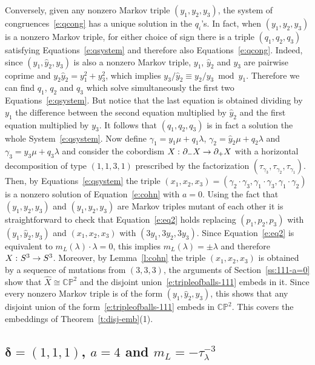 \documentclass[11pt,a4paper]{amsart}
\newcommand{\CP}{\mathbb{CP}}
\newcommand{\de}{\delta}
\newcommand{\ga}{\gamma}
\newcommand{\la}{\lambda}
\newcommand{\del}{\partial}
\newcommand{\co}{\thinspace\colon}
\newcommand{\bde}{\bm{\de}}
\theoremstyle{definition}
\numberwithin{equation}{section}
\begin{document}
Conversely, given any nonzero Markov triple 
$(y_1,y_2,y_3)$, the system of 
congruences~\eqref{e:qcong} has a unique solution in the $q_i$'s. In fact, when 
$(y_1,y_2,y_3)$ is a nonzero Markov triple, for either choice of sign 
there is a triple $(q_1,q_2,q_3)$ satisfying 
Equations~\eqref{e:qsystem} and therefore also Equations~\eqref{e:qcong}. Indeed, 
since $(y_1,\hat y_2,y_3)$ is also a nonzero Markov triple, $y_1$, $\hat y_2$ and $y_3$ are 
pairwise coprime and $y_2 \hat y_2=y_1^2+y_3^2$, which implies 
$y_3/\hat y_2\equiv y_2/y_3\bmod y_1$. 
Therefore we can find $q_1$, $q_2$ and $q_3$ which solve simultaneously 
the first two Equations~\eqref{e:qsystem}. 
But notice that the last equation is obtained dividing by $y_1$ the difference between 
the second equation multiplied by $\hat y_2$ 
and the first equation multiplied by $y_3$. 
It follows that $(q_1,q_2,q_3)$ is in fact a solution 
the whole System~\eqref{e:qsystem}. Now define $\ga_1 = y_1\mu+q_1\la$, 
$\ga_2 = \hat y_2\mu+q_2\la$ and $\ga_3 = y_3\mu+q_3\la$ and consider the  
cobordism $X\co\del_- X\to\del_+ X$ with a horizontal decomposition of type $(1,1,3,1)$ prescribed  
by the factorization $(\tau_{\ga_3},\tau_{\ga_2},\tau_{\ga_1})$. Then, by 
Equations~\eqref{e:qsystem} the triple 
$(x_1,x_2,x_3) = (\ga_2\cdot\ga_3, \ga_1\cdot\ga_3,\ga_1\cdot\ga_2)$ 
is a nonzero solution of Equation~\eqref{e:cohn} with $a=0$. 
Using the fact that $(y_1,y_2,y_3)$ and $(y_1,\hat y_2,y_3)$ 
are Markov triples mutant of each other it is straightforward to check that 
Equation~\eqref{e:eq2} holds replacing $(p_1,p_2,p_3)$ with $(y_1,\hat y_2,y_3)$ 
and $(x_1,x_2,x_3)$ with $(3y_1,3y_2,3y_3)$. Since Equation~\eqref{e:eq2} is equivalent 
to $m_L(\la)\cdot\la=0$, this implies $m_L(\la) = \pm \la$ and therefore $X\co S^3\to S^3$.
Moreover, by Lemma~\ref{l:cohn} the triple $(x_1,x_2,x_3)$ is obtained by a sequence 
of mutations from $(3,3,3)$, the arguments of Section~\ref{ss:111-a=0} show that 
$\hat X\cong\CP^2$ and the disjoint union~\eqref{e:tripleofballs-111} embeds in it. 
Since every nonzero Markov triple is of the form $(y_1,\hat y_2,y_3)$, 
this shows that any disjoint union of the form~\eqref{e:tripleofballs-111} embeds in $\CP^2$. 
This covers the embeddings of Theorem~\ref{t:disj-emb}(1).

\subsection{$\bde = (1,1,1)$, $a=4$ and $m_L = -\tau_\la^{-3}$}\label{ss:pairs=111-a=4}
\end{document}

